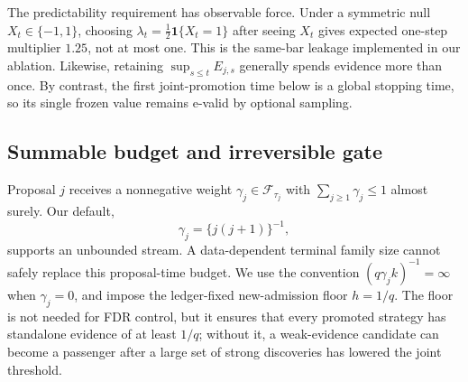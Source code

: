 The predictability requirement has observable force.  Under a symmetric null
\(X_t\in\{-1,1\}\), choosing
\(\lambda_t=\tfrac12\mathbf1\{X_t=1\}\) after seeing \(X_t\) gives expected
one-step multiplier \(1.25\), not at most one.  This is the same-bar leakage
implemented in our ablation.  Likewise, retaining
\(\sup_{s\le t}E_{j,s}\) generally spends evidence more than once.  By
contrast, the first joint-promotion time below is a global stopping time, so
its single frozen value remains e-valid by optional sampling.

\subsection{Summable budget and irreversible gate}

Proposal \(j\) receives a nonnegative weight
\(\gamma_j\in\mathcal F_{\tau_j}\) with
\(\sum_{j\ge1}\gamma_j\le1\) almost surely.  Our default,
\begin{equation}
\gamma_j=\{j(j+1)\}^{-1},
\label{eq:gamma}
\end{equation}
supports an unbounded stream.  A data-dependent terminal family size cannot
safely replace this proposal-time budget.  We use the convention
\((q\gamma_jk)^{-1}=\infty\) when \(\gamma_j=0\), and impose the ledger-fixed
new-admission floor \(h=1/q\).  The floor is not needed for FDR control, but it
ensures that every promoted strategy has standalone evidence of at least
\(1/q\); without it, a weak-evidence candidate can become a passenger after a
large set of strong discoveries has lowered the joint threshold.

